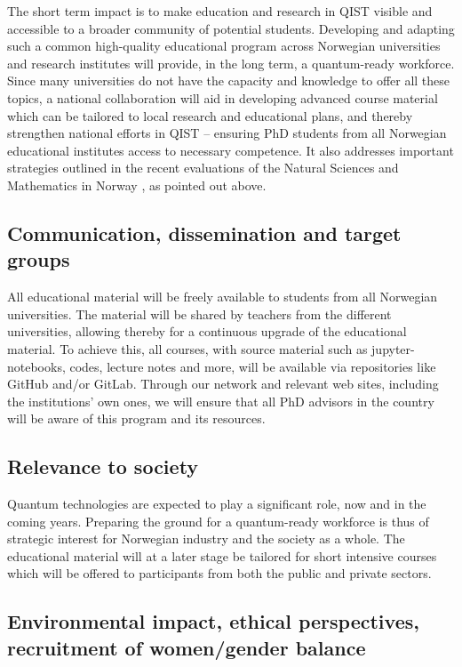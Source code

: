 \documentclass{scrreprt}
\begin{document}
The short term impact is to make education and research in QIST 
visible and accessible to a broader community of potential students. Developing and adapting such a common high-quality educational program across Norwegian universities and research institutes will provide, in the long term, a quantum-ready workforce. Since many universities do not have the capacity and knowledge to offer all these topics, a national collaboration will aid in developing advanced course material which can be tailored to local research and educational plans, and thereby strengthen national efforts in QIST -- ensuring PhD students from all Norwegian educational institutes access to necessary competence. It also addresses important strategies outlined in the recent evaluations of the Natural Sciences and Mathematics in Norway \cite{evalnat,evalmat}, as pointed out above. 

\subsection{Communication, dissemination and target groups}

All educational material will be freely available to students from all
Norwegian universities. The material will be shared by teachers from
the different universities, allowing thereby for a continuous upgrade
of the educational material.  To achieve this, all courses, with
source material such as jupyter-notebooks, codes, lecture notes and more,
will be available via repositories like GitHub and/or GitLab. Through our network and relevant web sites, including the institutions' own ones, we will ensure that all PhD advisors in the country will be aware of this program and its resources.


\subsection{Relevance to society}
Quantum technologies are expected to play a significant role, now and in the coming years. Preparing the ground for a quantum-ready workforce is thus of strategic interest for Norwegian industry and the society as a whole. 
The educational material will at a later stage be tailored for short intensive courses which will be offered to participants from both the public and private sectors. 

\subsection{Environmental impact, ethical perspectives, recruitment of women/gender balance }
\end{document}
